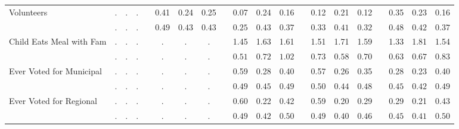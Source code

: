 \begin{center}
{\begin{longtable}{L{5cm} c c c p{.5cm} c c c p{.5cm} c c c p{.5cm} c c c p{.5cm} c c c}
 \quad Volunteers & . &         . &         . & &      0.41 &      0.24 &      0.25 & &      0.07 &      0.24 &      0.16 & &      0.12 &      0.21 &      0.12 & &      0.35 &      0.23 &      0.16 \\*
 \quad & $\mathit{        .}$ & $\mathit{        .}$ & $\mathit{        .}$ & & $\mathit{     0.49}$ & $\mathit{     0.43}$ & $\mathit{     0.43}$ & & $\mathit{     0.25}$ & $\mathit{     0.43}$ & $\mathit{     0.37}$ & & $\mathit{     0.33}$ & $\mathit{     0.41}$ & $\mathit{     0.32}$ & & $\mathit{     0.48}$ & $\mathit{     0.42}$ & $\mathit{     0.37}$ \\[.2em]
 \quad Child Eats Meal with Fam & . &         . &         . & &         . &         . &         . & &      1.45 &      1.63 &      1.61 & &      1.51 &      1.71 &      1.59 & &      1.33 &      1.81 &      1.54 \\*
 \quad & $\mathit{        .}$ & $\mathit{        .}$ & $\mathit{        .}$ & & $\mathit{        .}$ & $\mathit{        .}$ & $\mathit{        .}$ & & $\mathit{     0.51}$ & $\mathit{     0.72}$ & $\mathit{     1.02}$ & & $\mathit{     0.73}$ & $\mathit{     0.58}$ & $\mathit{     0.70}$ & & $\mathit{     0.63}$ & $\mathit{     0.67}$ & $\mathit{     0.83}$ \\[.2em]
 \quad Ever Voted for Municipal & . &         . &         . & &         . &         . &         . & &      0.59 &      0.28 &      0.40 & &      0.57 &      0.26 &      0.35 & &      0.28 &      0.23 &      0.40 \\*
 \quad & $\mathit{        .}$ & $\mathit{        .}$ & $\mathit{        .}$ & & $\mathit{        .}$ & $\mathit{        .}$ & $\mathit{        .}$ & & $\mathit{     0.49}$ & $\mathit{     0.45}$ & $\mathit{     0.49}$ & & $\mathit{     0.50}$ & $\mathit{     0.44}$ & $\mathit{     0.48}$ & & $\mathit{     0.45}$ & $\mathit{     0.42}$ & $\mathit{     0.49}$ \\[.2em]
 \quad Ever Voted for Regional & . &         . &         . & &         . &         . &         . & &      0.60 &      0.22 &      0.42 & &      0.59 &      0.20 &      0.29 & &      0.29 &      0.21 &      0.43 \\*
 \quad & $\mathit{        .}$ & $\mathit{        .}$ & $\mathit{        .}$ & & $\mathit{        .}$ & $\mathit{        .}$ & $\mathit{        .}$ & & $\mathit{     0.49}$ & $\mathit{     0.42}$ & $\mathit{     0.50}$ & & $\mathit{     0.49}$ & $\mathit{     0.40}$ & $\mathit{     0.46}$ & & $\mathit{     0.45}$ & $\mathit{     0.41}$ & $\mathit{     0.50}$ \\[.2em]

\end{longtable}}
\end{center}
